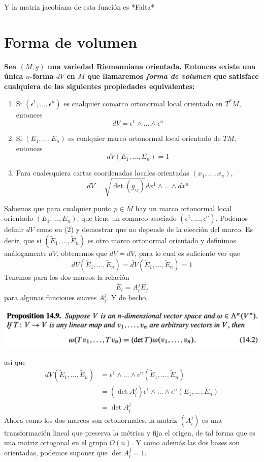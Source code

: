 \documentclass[11pt]{article}
\begin{document}
Y la matriz jacobiana de esta función es *Falta*

\newpage
\section{Forma de volumen}
\textbf{Sea $(M,g)$ una variedad Riemanniana orientada. Entonces existe una única $n$-forma $dV$ en $M$ que llamaremos \textit{forma de volumen} que satisface cualquiera de las siguientes propiedades equivalentes:}
\begin{enumerate}[label={(\arabic*)}]
    \item Si $(\epsilon^1,...,\epsilon^n)$ es cualquier comarco ortonormal local orientado en $T^*M$, entonces
    $$dV=\epsilon^1\wedge...\wedge\epsilon^n$$
    \item Si $(E_1,...,E_n)$ es cualquier marco ortonormal local orientado de $TM$, entonces
    $$dV(E_1,...,E_n)=1$$
    \item Para cualesquiera cartas coordenadas locales orientadas $(x_1,...,x_n)$,
    $$dV=\sqrt{\det (g_{ij})}dx^1\wedge...\wedge dx^n$$
\end{enumerate}
Sabemos que para cualquier punto $p\in M$ hay un marco ortonormal local orientado $(E_1,...,E_n)$, que tiene un comarco asociado $(\epsilon^1,...,\epsilon^n)$. Podemos definir $dV$ como en (2) y demostrar que no depende de la elección del marco. Es decir, que si $(\widetilde{E}_1,...,\widetilde{E}_n)$ es otro marco ortonormal orientado y definimos análogamente $\widetilde{dV}$, obtenemos que $dV=\widetilde{dV}$, para lo cual es suficiente ver que 
$$dV(\widetilde{E}_1,...,\widetilde{E}_n)=\widetilde{dV}(\widetilde{E}_1,...,\widetilde{E}_n)=1$$
Tenemos para los dos marcos la relación
$$\widetilde{E_i}=A^j_iE_j$$
para algunas funciones suaves $A^j_i$. Y de hecho,\par
\hfill\break
\centerline{\includegraphics[scale=0.5]{prop14.9.png}}
así que
\begin{align*}
dV(\widetilde{E}_1,...,\widetilde{E}_n)&=\epsilon^1\wedge...\wedge\epsilon^n(\widetilde{E}_1,...,\widetilde{E}_n)\\
&=(\det{A^j_i})\epsilon^1\wedge...\wedge\epsilon^n(E_1,...,E_n)\\
&=\det{A^j_i}
\end{align*}
Ahora como los dos marcos son ortonormales, la matriz $(A^j_i)$ es una transformación lineal que preserva la métrica y fija el origen, de tal forma que es una matriz ortogonal en el grupo $O(n)$. Y como además las dos bases son orientadas, podemos suponer que $\det{A^j_i}=1$.\par
\end{document}
